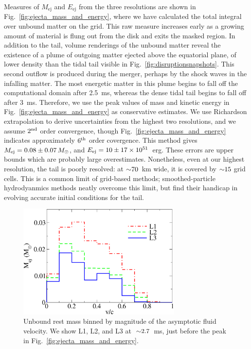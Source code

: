 Measures of $M_{\text{ej}}$ and $E_{\text{ej}}$ from the three resolutions
are shown in Fig.~\ref{fig:ejecta_mass_and_energy}, where we have calculated the total integral
over unbound matter on the grid.
This raw measure increases early as a growing amount of material
is flung out from the disk and exits the masked region.
In addition to the tail, volume renderings of the unbound matter reveal the existence of
a plume of outgoing matter ejected above the equatorial plane, of lower density than the tidal tail visible
in Fig.~\ref{fig:disruptionsnapshots}.  This second outflow is produced during
the merger, perhaps by the shock waves in the infalling matter. 
The most energetic matter in this plume begins to fall off the
computational domain after 2.5~ms, whereas the dense tidal tail begins to fall off
after 3~ms. Therefore, we use the peak values of mass and kinetic energy in
Fig.~\ref{fig:ejecta_mass_and_energy} as conservative estimates.
We use Richardson extrapolation to derive uncertainties from the highest two resolutions,
and we assume $2^{\rm nd}$ order convergence, though Fig.~\ref{fig:ejecta_mass_and_energy}
indicates approximately $6^{\rm th}$ order covergence. This method gives
$M_{\rm ej}= 0.08 \pm 0.07 \,M_{\odot}$, and
$E_{\rm ej} = 10 \pm 17 \times 10^{51}$~erg.
These errors are upper bounds which are probably large overestimates.
Nonetheless, even at our highest resolution, the tail is poorly resolved:
at $\mathord{\sim}70$~km wide, it is covered by $\mathord{\sim}15$ grid cells. This is a common limit
of grid-based methods; smoothed-particle hydrodyanmics methods neatly overcome this
limit, but find their handicap in evolving accurate initial conditions for the tail.

\begin{figure}
\includegraphics[width=8.2cm]{Figures/unbound_velocity_histogram}
\caption[Unbound matter asymptotic velocity]{
Unbound rest mass binned by magnitude of the asymptotic fluid velocity.
We show L1, L2, and L3 at $~\mathord{\sim}2.7$~ms, just before the peak in
Fig.~\ref{fig:ejecta_mass_and_energy}.
}
\label{fig:ejecta_velocity_histogram}
\end{figure}

